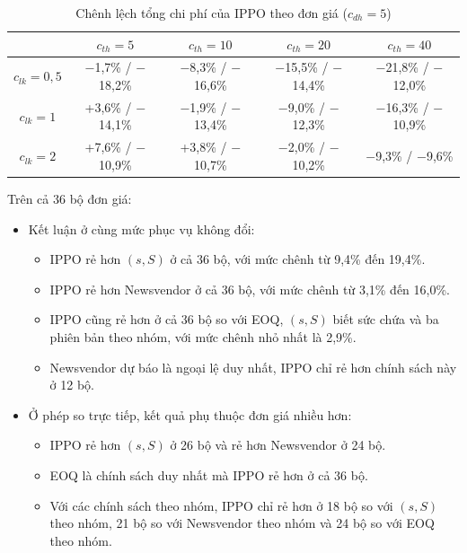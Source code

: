 \begin{table}[H]
    \centering
    \caption{Chênh lệch tổng chi phí của IPPO theo đơn giá ($c_{dh} = 5$)}
    \label{tab:doNhay}
    \small
    \setlength{\tabcolsep}{3pt}
    \begin{tabular}{|c|c|c|c|c|}
        \hline
        & $c_{th} = 5$ & $c_{th} = 10$ & $c_{th} = 20$ & $c_{th} = 40$ \\
        \hline
        $c_{lk} = 0{,}5$ & $-$1,7\% / $-$18,2\% & $-$8,3\% / $-$16,6\% & $-$15,5\% / $-$14,4\% & $-$21,8\% / $-$12,0\% \\ \hline
        $c_{lk} = 1$     & +3,6\% / $-$14,1\% & $-$1,9\% / $-$13,4\% & $-$9,0\% / $-$12,3\% & $-$16,3\% / $-$10,9\% \\ \hline
        $c_{lk} = 2$     & +7,6\% / $-$10,9\% & +3,8\% / $-$10,7\% & $-$2,0\% / $-$10,2\% & $-$9,3\% / $-$9,6\% \\
        \hline
    \end{tabular}
\end{table}

Trên cả 36 bộ đơn giá:
\begin{itemize}
    \item Kết luận ở cùng mức phục vụ không đổi:
    \begin{itemize}
        \item IPPO rẻ hơn $(s,S)$ ở cả 36 bộ, với mức chênh từ 9,4\% đến 19,4\%.
        \item IPPO rẻ hơn Newsvendor ở cả 36 bộ, với mức chênh từ 3,1\% đến 16,0\%.
        \item IPPO cũng rẻ hơn ở cả 36 bộ so với EOQ, $(s,S)$ biết sức chứa và ba phiên bản theo nhóm, với mức chênh nhỏ nhất là 2,9\%.
        \item Newsvendor dự báo là ngoại lệ duy nhất, IPPO chỉ rẻ hơn chính sách này ở 12 bộ.
    \end{itemize}
    \item Ở phép so trực tiếp, kết quả phụ thuộc đơn giá nhiều hơn:
    \begin{itemize}
        \item IPPO rẻ hơn $(s,S)$ ở 26 bộ và rẻ hơn Newsvendor ở 24 bộ.
        \item EOQ là chính sách duy nhất mà IPPO rẻ hơn ở cả 36 bộ.
        \item Với các chính sách theo nhóm, IPPO chỉ rẻ hơn ở 18 bộ so với $(s,S)$ theo nhóm, 21 bộ so với Newsvendor theo nhóm và 24 bộ so với EOQ theo nhóm.
    \end{itemize}
\end{itemize}

